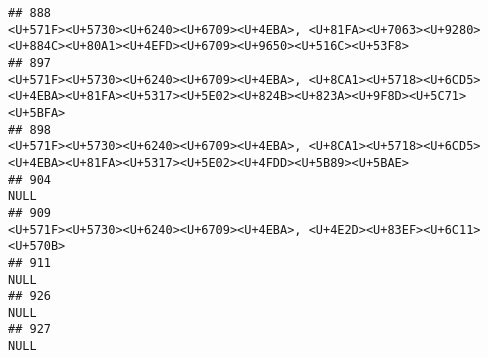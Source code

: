 \documentclass[
]{article}
\begin{document}
\begin{verbatim}
## 888                                                                                                                                                                                                         <U+571F><U+5730><U+6240><U+6709><U+4EBA>, <U+81FA><U+7063><U+9280><U+884C><U+80A1><U+4EFD><U+6709><U+9650><U+516C><U+53F8>
## 897                                                                                                                                                                                         <U+571F><U+5730><U+6240><U+6709><U+4EBA>, <U+8CA1><U+5718><U+6CD5><U+4EBA><U+81FA><U+5317><U+5E02><U+824B><U+823A><U+9F8D><U+5C71><U+5BFA>
## 898                                                                                                                                                                                                         <U+571F><U+5730><U+6240><U+6709><U+4EBA>, <U+8CA1><U+5718><U+6CD5><U+4EBA><U+81FA><U+5317><U+5E02><U+4FDD><U+5B89><U+5BAE>
## 904                                                                                                                                                                                                                                                                                                                               NULL
## 909                                                                                                                                                                                                                                                         <U+571F><U+5730><U+6240><U+6709><U+4EBA>, <U+4E2D><U+83EF><U+6C11><U+570B>
## 911                                                                                                                                                                                                                                                                                                                               NULL
## 926                                                                                                                                                                                                                                                                                                                               NULL
## 927                                                                                                                                                                                                                                                                                                                               NULL

\end{verbatim}
\end{document}
